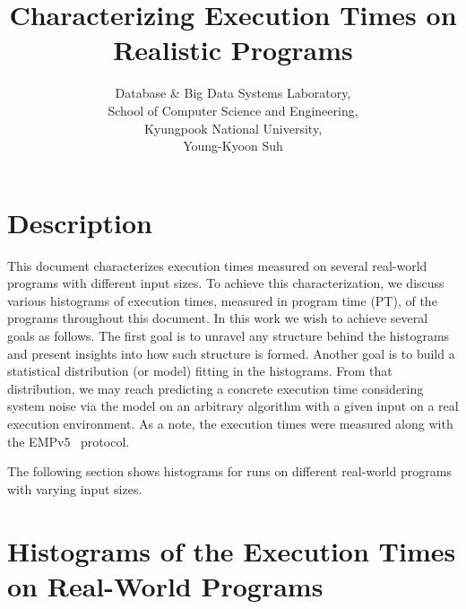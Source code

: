 \documentclass[10pt]{article}
\begin{document}
\title{Characterizing Execution Times on Realistic Programs}

\author{
Database \& Big Data Systems Laboratory,\\
School of Computer Science and Engineering, \\
Kyungpook National University,\\
Young-Kyoon Suh\\
}
\maketitle

\section{Description}
This document characterizes execution times 
measured on several real-world programs with different input sizes. 
To achieve this characterization, we discuss 
various histograms of execution times, measured in program time (PT), of the programs throughout this document. 
In this work we wish to achieve several goals as follows. 
The first goal is to unravel any structure behind the histograms and present insights into how such structure is formed. 
Another goal is to build a statistical distribution (or model) fitting in the histograms. 
From that distribution, we may reach predicting a concrete execution time considering system noise via 
the model on an arbitrary algorithm with a given input on a real execution environment. 
As a note, the execution times were measured along with the EMPv5~\cite{EMP} protocol. 

The following section shows histograms for runs on 
different real-world programs with varying input sizes.

\section{Histograms of the Execution Times on Real-World Programs~\label{sec:real-world}} 
\end{document}
